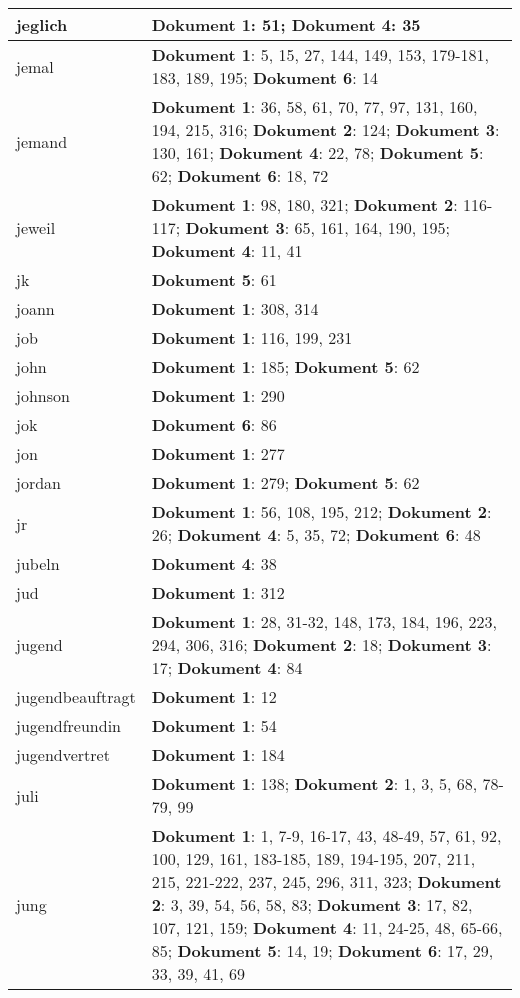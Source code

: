 \documentclass[a5paper]{article}
\begin{document}
\begin{longtable}[l]{|l|p{3in}|}
\hline
jeglich & \textbf{Dokument 1}: 51; \textbf{Dokument 4}: 35 \\
\hline
jemal & \textbf{Dokument 1}: 5, 15, 27, 144, 149, 153, 179-181, 183, 189, 195; \textbf{Dokument 6}: 14 \\
\hline
jemand & \textbf{Dokument 1}: 36, 58, 61, 70, 77, 97, 131, 160, 194, 215, 316; \textbf{Dokument 2}: 124; \textbf{Dokument 3}: 130, 161; \textbf{Dokument 4}: 22, 78; \textbf{Dokument 5}: 62; \textbf{Dokument 6}: 18, 72 \\
\hline
jeweil & \textbf{Dokument 1}: 98, 180, 321; \textbf{Dokument 2}: 116-117; \textbf{Dokument 3}: 65, 161, 164, 190, 195; \textbf{Dokument 4}: 11, 41 \\
\hline
jk & \textbf{Dokument 5}: 61 \\
\hline
joann & \textbf{Dokument 1}: 308, 314 \\
\hline
job & \textbf{Dokument 1}: 116, 199, 231 \\
\hline
john & \textbf{Dokument 1}: 185; \textbf{Dokument 5}: 62 \\
\hline
johnson & \textbf{Dokument 1}: 290 \\
\hline
jok & \textbf{Dokument 6}: 86 \\
\hline
jon & \textbf{Dokument 1}: 277 \\
\hline
jordan & \textbf{Dokument 1}: 279; \textbf{Dokument 5}: 62 \\
\hline
jr & \textbf{Dokument 1}: 56, 108, 195, 212; \textbf{Dokument 2}: 26; \textbf{Dokument 4}: 5, 35, 72; \textbf{Dokument 6}: 48 \\
\hline
jubeln & \textbf{Dokument 4}: 38 \\
\hline
jud & \textbf{Dokument 1}: 312 \\
\hline
jugend & \textbf{Dokument 1}: 28, 31-32, 148, 173, 184, 196, 223, 294, 306, 316; \textbf{Dokument 2}: 18; \textbf{Dokument 3}: 17; \textbf{Dokument 4}: 84 \\
\hline
jugendbeauftragt & \textbf{Dokument 1}: 12 \\
\hline
jugendfreundin & \textbf{Dokument 1}: 54 \\
\hline
jugendvertret & \textbf{Dokument 1}: 184 \\
\hline
juli & \textbf{Dokument 1}: 138; \textbf{Dokument 2}: 1, 3, 5, 68, 78-79, 99 \\
\hline
jung & \textbf{Dokument 1}: 1, 7-9, 16-17, 43, 48-49, 57, 61, 92, 100, 129, 161, 183-185, 189, 194-195, 207, 211, 215, 221-222, 237, 245, 296, 311, 323; \textbf{Dokument 2}: 3, 39, 54, 56, 58, 83; \textbf{Dokument 3}: 17, 82, 107, 121, 159; \textbf{Dokument 4}: 11, 24-25, 48, 65-66, 85; \textbf{Dokument 5}: 14, 19; \textbf{Dokument 6}: 17, 29, 33, 39, 41, 69 \\

\end{longtable}
\end{document}
